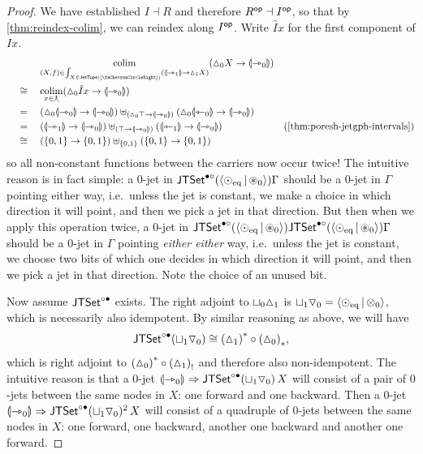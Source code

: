 \documentclass[a4paper]{memoir}
\begin{document}
\begin{proof}
	We have established $I \dashv R$ and therefore $R^{\mathsf{op}} \dashv I^{\mathsf{op}}$, so that by \cref{thm:reindex-colim}, we can reindex along $I^{\mathsf{op}}$. Write $\hat I x$ for the first component of $I x$.
	\begin{align*}
		&\quad\mathrel{\phantom{=}}\quad
		\colim_{(X, f) \in \int_{X \in \jettope{[\ypolar]}} (\rival{\jetsym_1} \to \cohdisc_1 X)}
		(\cohdisc_0 X \to \rival{\jetsym_0}) \\
		&\quad\cong\quad
		\colim_{x \in \walkingcospan} (\cohdisc_0 \hat I x \to \rival{\jetsym_0}) \\
		&\quad=\quad
		(\cohdisc_0 \rival{\jetsym_0} \to \rival{\jetsym_0}) \uplus_{(\cohdisc_0 \top \to \rival{\jetsym_0})} (\cohdisc_0 \rival{\tejsym_0} \to \rival{\jetsym_0}) \\
		&\quad=\quad (\rival{\jetsym_1} \to \rival{\jetsym_0}) \uplus_{(\top \to \rival{\jetsym_0})} (\rival{\tejsym_1} \to \rival{\jetsym_0})
		& \text{(\cref{thm:poresh-jetgph-intervals})} \\
		&\quad\cong\quad (\accol{0,1} \to \accol{0, 1}) \uplus_{\accol{0, 1}} (\accol{0,1} \to \accol{0, 1})
	\end{align*}
	so all non-constant functions between the carriers now occur twice!
	The intuitive reason is in fact simple: a $0$-jet in $\mathsf{JTSet}^{\bullet \circ}(\mathopen{}\left\langle {\odot}_{\mathrm{eq}} \,\middle|\, {\oast}_0 \right\rangle\mathclose{}) \Gamma$ should be a $0$-jet in $\Gamma$ pointing either way, i.e.\ unless the jet is constant, we make a choice in which direction it will point, and then we pick a jet in that direction.
	But then when we apply this operation twice, a $0$-jet in $\mathsf{JTSet}^{\bullet \circ}(\mathopen{}\left\langle {\odot}_{\mathrm{eq}} \,\middle|\, {\oast}_0 \right\rangle\mathclose{}) \mathsf{JTSet}^{\bullet \circ}(\mathopen{}\left\langle {\odot}_{\mathrm{eq}} \,\middle|\, {\oast}_0 \right\rangle\mathclose{}) \Gamma$  should be a $0$-jet in $\Gamma$ pointing \emph{either either} way, i.e.\ unless the jet is constant, we choose two bits of which one decides in which direction it will point, and then we pick a jet in that direction.
	Note the choice of an unused bit.
	
	Now assume $\mathsf{JTSet}^{\circ \bullet}$ exists.
	The right adjoint to ${\sqcup}_0 {\vartriangle}_1$ is ${\sqcup}_1 {\triangledown}_0 = \mathopen{}\left\langle {\odot}_{\mathrm{eq}} \,\middle|\, {\otimes}_0 \right\rangle\mathclose{}$, which is necessarily also idempotent.
	By similar reasoning as above, we will have
	\[
		\mathsf{JTSet}^{\circ \bullet}({\sqcup}_1 {\triangledown}_0) \cong {({\vartriangle}_1)}^* \circ {({\vartriangle}_0)}_*,
	\]
	which is right adjoint to ${({\vartriangle}_0)}^* \circ {({\vartriangle}_1)}_!$ and therefore also non-idempotent.
	The intuitive reason is that a $0$-jet ${\llparenthesis {\rightarrowtriangle}_0 \rrparenthesis} \Rightarrow \mathsf{JTSet}^{\circ \bullet}({\sqcup}_1 {\triangledown}_0)\,X$ will consist of a pair of $0$-jets between the same nodes in $X$: one forward and one backward.
	Then a $0$-jet ${\llparenthesis {\rightarrowtriangle}_0 \rrparenthesis} \Rightarrow \mathsf{JTSet}^{\circ \bullet}({\sqcup}_1 {\triangledown}_0)^2\,X$ will consist of a quadruple of $0$-jets between the same nodes in $X$: one forward, one backward, another one backward and another one forward.
\end{proof}
\end{document}
